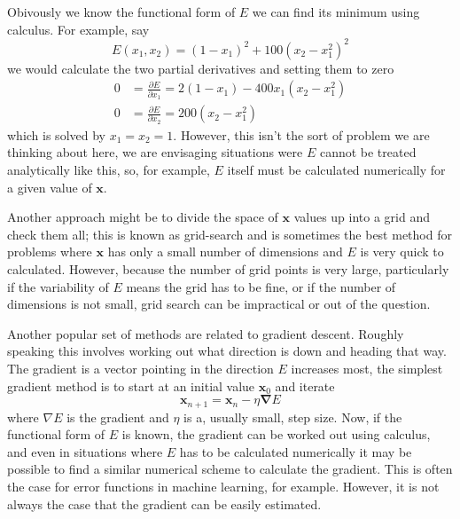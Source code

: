 \documentclass[11pt,a4paper]{scrartcl}
\begin{document}
Obivously we know the functional form of $E$ we can find its minimum using calculus. For example, say
\begin{equation}
E(x_1,x_2)=(1-x_1)^2+100(x_2-x_1^2)^2
\end{equation}
we would calculate the two partial derivatives and setting them to zero
\begin{equation}
\begin{aligned}
0&=\frac{\partial E}{\partial x_1}=2(1-x_1)-400x_1(x_2-x_1^2)\\
0&=\frac{\partial E}{\partial x_2}=200(x_2-x_1^2)
\end{aligned}
\end{equation}
which is solved by $x_1=x_2=1$. However, this isn't the sort of
problem we are thinking about here, we are envisaging situations were
$E$ cannot be treated analytically like this, so, for example, $E$
itself must be calculated numerically for a given value of
$\mathbf{x}$.

Another approach might be to divide the space of $\mathbf{x}$ values
up into a grid and check them all; this is known as grid-search and is
sometimes the best method for problems where $\mathbf{x}$ has only a
small number of dimensions and $E$ is very quick to
calculated. However, because the number of grid points is very large,
particularly if the variability of $E$ means the grid has to be fine,
or if the number of dimensions is not small, grid search can be
impractical or out of the question.

Another popular set of methods are related to gradient
descent. Roughly speaking this involves working out what direction is
down and heading that way. The gradient is a vector pointing in the
direction $E$ increases most, the simplest gradient method is to start
at an initial value $\mathbf{x}_0$ and iterate
\begin{equation}
\mathbf{x}_{n+1}=\mathbf{x}_n-\eta \mathbf{\nabla}E
\end{equation}
where ${\nabla}E$ is the gradient and $\eta$ is a, usually small, step
size. Now, if the functional form of $E$ is known, the gradient can be
worked out using calculus, and even in situations where $E$ has to be
calculated numerically it may be possible to find a similar numerical
scheme to calculate the gradient. This is often the case for error
functions in machine learning, for example. However, it is not always
the case that the gradient can be easily estimated.
\end{document}
